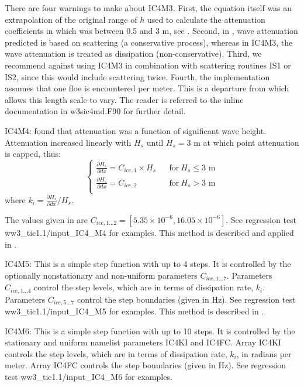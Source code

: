 \noindent
There are four warnings to make about {\code IC4M3}. First, the equation itself was an extrapolation of the original range of $h$ used to calculate the attenuation coefficients in \cite{art:KM08} which was between 0.5 and 3 m, see \cite{art:HT15}. Second, in \cite{art:KM08}, wave attenuation predicted is based on scattering (a conservative process), whereas in {\code IC4M3}, the wave attenuation is treated as dissipation (non-conservative). Third, we recommend against using {\code IC4M3} in combination with scattering routines {\code IS1} or {\code IS2}, since this would include scattering twice. Fourth, the implementation assumes that one floe is encountered per meter. This is a departure from \cite{art:HT15} which allows this length scale to vary. The reader is referred to the inline documentation in {\file w3sic4md.F90} for further detail.

{\code IC4M4}: \cite{art:Ko14} found that attenuation was a function of significant wave height. Attenuation increased linearly with ${H_s}$ until ${H_s} = 3$ m at which point attenuation is capped, thus:
\begin{equation}
\left \{
\begin{array}{llrcl}
{\frac{\partial H_s}{\partial dx}} = {C_{ice,1}}\times {H_s}   & & \text{for} \> {H_s} \leq 3 \text{ m}  \\
{\frac{\partial H_s}{\partial dx}} = {C_{ice,2}}               & & \text{for} \> {H_s} > 3 \text{ m}     \\
\end{array} \right .
\end{equation}
where {$k_i=\frac{\partial H_s}{\partial dx}/H_s$}.

The values given in \cite{art:Ko14} are ${C_{ice,1...2}}=[5.35\times 10^{-6}, 16.05\times 10^{-6}]$. See regression test {\file ww3\_tic1.1/input\_IC4\_M4} for examples. This method is described and applied in \cite{rep:CR17}.

{\code IC4M5}: This is a simple step function with up to 4 steps. It is controlled by the optionally nonstationary and non-uniform parameters ${C_{ice,1...7}}$. Parameters ${C_{ice,1...4}}$ control the step levels, which are in terms of dissipation rate, ${k_i}$. Parameters ${C_{ice,5...7}}$ control the step boundaries (given in Hz). See regression test {\file ww3\_tic1.1/input\_IC4\_M5} for examples. This method is described in \cite{rep:CR17}.

{\code IC4M6}: This is a simple step function with up to 10 steps. It is controlled by the stationary and uniform namelist parameters {\code IC4KI} and {\code IC4FC}. Array {\code IC4KI} controls the step levels, which are in terms of dissipation rate, ${k_i}$, in radians per meter. Array {\code IC4FC} controls the step boundaries (given in Hz). See regression test {\file ww3\_tic1.1/input\_IC4\_M6} for examples.

